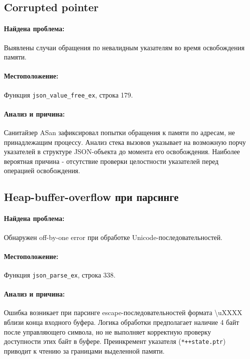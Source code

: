     \subsection{Corrupted pointer}

    \paragraph{Найдена проблема:} Выявлены случаи обращения по невалидным указателям во время освобождения памяти.

    \paragraph{Местоположение:} Функция \texttt{json\_value\_free\_ex}, строка 179.

    \paragraph{Анализ и причина:} Санитайзер ASan зафиксировал попытки обращения к памяти по адресам, не принадлежащим процессу. Анализ стека вызовов указывает на возможную порчу указателей в структуре JSON-объекта до момента его освобождения. Наиболее вероятная причина - отсутствие проверки целостности указателей перед операцией освобождения.

    \subsection{Heap-buffer-overflow при парсинге}

    \paragraph{Найдена проблема:} Обнаружен off-by-one error при обработке Unicode-последовательностей.

    \paragraph{Местоположение:} Функция \texttt{json\_parse\_ex}, строка 338.

    \paragraph{Анализ и причина:} Ошибка возникает при парсинге escape-последовательностей формата \textbackslash uXXXX вблизи конца входного буфера. Логика обработки предполагает наличие 4 байт после управляющего символа, но не выполняет корректную проверку доступности этих байт в буфере. Преинкремент указателя (\texttt{*++state.ptr}) приводит к чтению за границами выделенной памяти.


